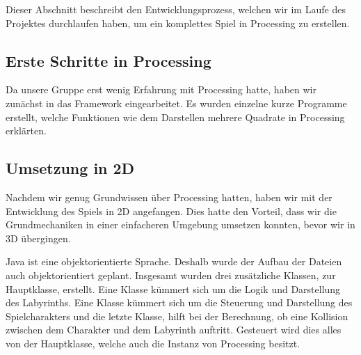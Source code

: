 Dieser Abschnitt beschreibt den Entwicklungsprozess, welchen wir im Laufe des Projektes durchlaufen haben, um ein komplettes Spiel in Processing zu erstellen.

\subsection{Erste Schritte in Processing}\label{subsec:erste-schritte}
Da unsere Gruppe erst wenig Erfahrung mit Processing hatte, haben wir zunächst in das Framework eingearbeitet. Es wurden einzelne kurze Programme erstellt, welche Funktionen wie dem Darstellen mehrere Quadrate in Processing erklärten.

\subsection{Umsetzung in 2D}\label{subsec:umsetzung-in-2D}
Nachdem wir genug Grundwissen über Processing hatten, haben wir mit der Entwicklung des Spiels in 2D angefangen. Dies hatte den Vorteil, dass wir die Grundmechaniken in einer einfacheren Umgebung umsetzen konnten, bevor wir in 3D übergingen.

Java ist eine objektorientierte Sprache. Deshalb wurde der Aufbau der Dateien auch objektorientiert geplant. Insgesamt wurden drei zusätzliche Klassen, zur Hauptklasse, erstellt. Eine Klasse kümmert sich um die Logik und Darstellung des Labyrinths. Eine Klasse kümmert sich um die Steuerung und Darstellung des Spielcharakters und die letzte Klasse, hilft bei der Berechnung, ob eine Kollision zwischen dem Charakter und dem Labyrinth auftritt. Gesteuert wird dies alles von der Hauptklasse, welche auch die Instanz von Processing besitzt.

